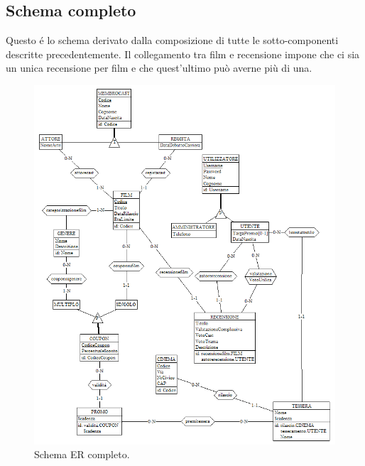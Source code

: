 \documentclass[a4paper,12pt]{report}
\begin{document}
	\subsection{Schema completo}
	Questo é lo schema derivato dalla composizione di tutte le sotto-componenti descritte precedentemente. Il collegamento tra film e recensione impone che ci sia un unica recensione per film e che quest'ultimo può averne più di una.
	\begin{figure}[H]
		\centering
		\includegraphics[width=480pt]{ER/ercompleto.png}
		\caption{Schema ER completo.}
	\end{figure}
\end{document}
